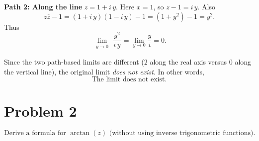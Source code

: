 \documentclass[12pt]{article}
\theoremstyle{definition} %
\theoremstyle{plain} %
\begin{document}
    \medskip
    \noindent
    \textbf{Path 2: Along the line } $z = 1 + i\,y$.
    Here $x=1$, so $z-1 = i\,y$.  Also
    \[
    z\overline{z} - 1 = (1 + i\,y)(1 - i\,y) - 1 = (1 + y^2) - 1 = y^2.
    \]
    Thus
    \[
    \lim_{\substack{y \to 0}}
    \frac{\,y^2\,}{i\,y}
    =
    \lim_{y \to 0}
    \frac{y}{i}
    =
    0.
    \]
    
    Since the two path‐based limits are different (\(2\) along the real axis versus \(0\) along the vertical line), 
    the original limit \emph{does not exist}.  In other words,
    \[
    \boxed{\text{The limit does not exist.}}
    \]
    
    \bigskip
    
    \section*{Problem 2}
    \[
    \text{Derive a formula for } \arctan(z) \text{ (without using inverse trigonometric functions).}
    \]
    
\end{document}
